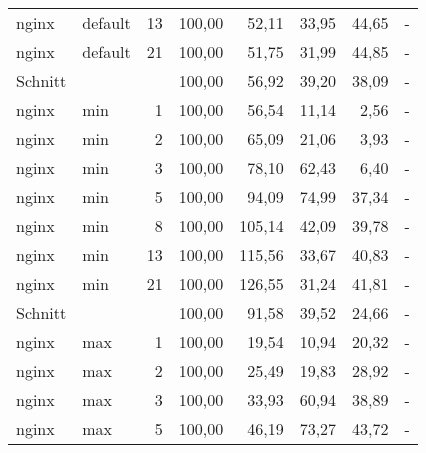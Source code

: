\begin{footnotesize}
\begin{longtable}{llrrrrrr}
		nginx          & default & 13         & 100,00 & 52,11                       & 33,95                          & 44,65  & -      \\
		nginx          & default & 21         & 100,00 & 51,75                       & 31,99                          & 44,85  & -      \\ \hline
		Schnitt        &         &            & 100,00 & 56,92                       & 39,20                          & 38,09  & -      \\ \hline
		nginx          & min     & 1          & 100,00 & 56,54                       & 11,14                          & 2,56   & -      \\
		nginx          & min     & 2          & 100,00 & 65,09                       & 21,06                          & 3,93   & -      \\
		nginx          & min     & 3          & 100,00 & 78,10                       & 62,43                          & 6,40   & -      \\
		nginx          & min     & 5          & 100,00 & 94,09                       & 74,99                          & 37,34  & -      \\
		nginx          & min     & 8          & 100,00 & 105,14                      & 42,09                          & 39,78  & -      \\
		nginx          & min     & 13         & 100,00 & 115,56                      & 33,67                          & 40,83  & -      \\
		nginx          & min     & 21         & 100,00 & 126,55                      & 31,24                          & 41,81  & -      \\ \hline
		Schnitt        &         &            & 100,00 & 91,58                       & 39,52                          & 24,66  & -      \\ \hline
		nginx          & max     & 1          & 100,00 & 19,54                       & 10,94                          & 20,32  & -      \\
		nginx          & max     & 2          & 100,00 & 25,49                       & 19,83                          & 28,92  & -      \\
		nginx          & max     & 3          & 100,00 & 33,93                       & 60,94                          & 38,89  & -      \\
		nginx          & max     & 5          & 100,00 & 46,19                       & 73,27                          & 43,72  & -      \\

\end{longtable}
\end{footnotesize}
